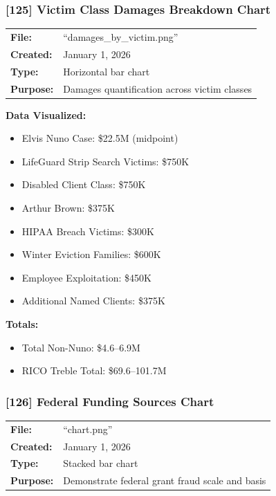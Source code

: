 \documentclass[11pt,letterpaper]{article}
\newcommand{\citeref}[1]{\textbf{\color{NavyBlue}[#1]}}
\begin{document}
\subsubsection{\citeref{125} Victim Class Damages Breakdown Chart}

\begin{tabular}{@{}p{1.4in}p{4.6in}@{}}
\textbf{File:} & ``damages\_by\_victim.png''\\
\textbf{Created:} & January 1, 2026\\
\textbf{Type:} & Horizontal bar chart\\
\textbf{Purpose:} & Damages quantification across victim classes\\
\end{tabular}

\vspace{0.1in}

\textbf{Data Visualized:}
\begin{itemize}[leftmargin=*]
\item Elvis Nuno Case: \$22.5M (midpoint)
\item LifeGuard Strip Search Victims: \$750K
\item Disabled Client Class: \$750K
\item Arthur Brown: \$375K
\item HIPAA Breach Victims: \$300K
\item Winter Eviction Families: \$600K
\item Employee Exploitation: \$450K
\item Additional Named Clients: \$375K
\end{itemize}

\textbf{Totals:}
\begin{itemize}[leftmargin=*]
\item Total Non-Nuno: \$4.6--6.9M
\item RICO Treble Total: \$69.6--101.7M
\end{itemize}

\subsubsection{\citeref{126} Federal Funding Sources Chart}

\begin{tabular}{@{}p{1.4in}p{4.6in}@{}}
\textbf{File:} & ``chart.png''\\
\textbf{Created:} & January 1, 2026\\
\textbf{Type:} & Stacked bar chart\\
\textbf{Purpose:} & Demonstrate federal grant fraud scale and basis\\
\end{tabular}
\end{document}
